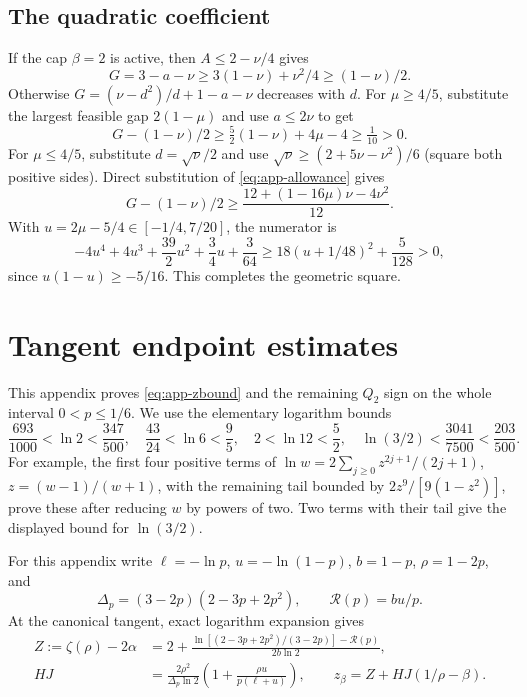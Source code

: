 \subsection*{The quadratic coefficient}
If the cap $\beta=2$ is active, then $A\le2-\nu/4$ gives
\[
 G=3-a-\nu\ge3(1-\nu)+\nu^2/4\ge(1-\nu)/2.
\]
Otherwise $G=(\nu-d^2)/d+1-a-\nu$ decreases with $d$. For $\mu\ge4/5$, substitute
the largest feasible gap $2(1-\mu)$ and use $a\le2\nu$ to get
\[
 G-(1-\nu)/2\ge\tfrac52(1-\nu)+4\mu-4\ge\tfrac1{10}>0.
\]
For $\mu\le4/5$, substitute $d=\sqrt \nu/2$ and use
$\sqrt\nu\ge(2+5\nu-\nu^2)/6$ (square both positive sides). Direct substitution of \eqref{eq:app-allowance} gives
\[
 G-(1-\nu)/2\ge\frac{12+(1-16\mu)\nu-4\nu^2}{12}.
\]
With $u=2\mu-5/4\in[-1/4,7/20]$, the numerator is
\[
 -4u^4+4u^3+\frac{39}{2}u^2+\frac34u+\frac3{64}
 \ge18(u+1/48)^2+\frac5{128}>0,
\]
since $u(1-u)\ge-5/16$. This completes the geometric square.

\section{Tangent endpoint estimates}\label{app:tangent}
This appendix proves \eqref{eq:app-zbound} and the remaining $Q_2$ sign on the
whole interval $0<p\le1/6$. We use the elementary logarithm bounds
\[
 \frac{693}{1000}<\ln2<\frac{347}{500},\quad
 \frac{43}{24}<\ln6<\frac95,\quad
 2<\ln12<\frac52,\quad
 \ln(3/2)<\frac{3041}{7500}<\frac{203}{500}.
\]
For example, the first four positive terms of
$\ln w=2\sum_{j\ge0}z^{2j+1}/(2j+1)$, $z=(w-1)/(w+1)$, with the remaining tail bounded by $2z^9/[9(1-z^2)]$, prove these after reducing $w$ by powers of two. Two terms with their tail give the displayed bound for $\ln(3/2)$.

For this appendix write $\ell=-\ln p$, $u=-\ln(1-p)$, $b=1-p$, $\rho=1-2p$, and
\[
 \Delta_p=(3-2p)(2-3p+2p^2),\qquad \mathcal R(p)=bu/p.
\]
At the canonical tangent, exact logarithm expansion gives
\begin{equation}\label{eq:app-canonicalexact}
\begin{aligned}
 Z:=\zeta(\rho)-2\alpha
 &=2+\frac{\ln[(2-3p+2p^2)/(3-2p)]-\mathcal R(p)}{2b\ln2},\\
 HJ&=\frac{2\rho^2}{\Delta_p\ln2}
       \left(1+\frac{\rho u}{p(\ell+u)}\right),
 \qquad z_\beta=Z+HJ(1/\rho-\beta).
\end{aligned}
\end{equation}

